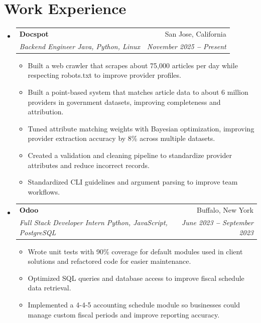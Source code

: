 \documentclass[11pt]{article}
\makeatletter
\newcommand{\resumeItem}[1]{
  \item\small{
    {#1 \vspace{-2pt}}
  }
}
\newcommand{\resumeSubheading}[4]{
  \vspace{-2pt}\item
    \begin{tabular*}{0.97\textwidth}[t]{l@{\extracolsep{\fill}}r}
      \textbf{#1} & #2 \\
      \textit{\small#3} & \textit{\small #4} \\
    \end{tabular*}\vspace{-7pt}
}
\newcommand{\resumeSubHeadingListStart}{\begin{itemize}[leftmargin=0.15in, label={}]}
\newcommand{\resumeSubHeadingListEnd}{\end{itemize}}
\newcommand{\resumeItemListStart}{\begin{itemize}[itemsep=3pt]}
\newcommand{\resumeItemListEnd}{\end{itemize}\vspace{-5pt}}
\makeatother
\begin{document}
\section{Work Experience}
  \vspace{3pt}
  \resumeSubHeadingListStart
    \resumeSubheading
      {Docspot}{San Jose, California}
      {Backend Engineer 	\textbar{} Java, Python, Linux}{November 2025 \textbf{--} Present}
        \resumeItemListStart
            \resumeItem{Built a web crawler that scrapes about 75,000 articles per day while respecting robots.txt to improve provider profiles.}
            \resumeItem{Built a point-based system that matches article data to about 6 million providers in government datasets, improving completeness and attribution.}
            \resumeItem{Tuned attribute matching weights with Bayesian optimization, improving provider extraction accuracy by 8\% across multiple datasets.}
            \resumeItem{Created a validation and cleaning pipeline to standardize provider attributes and reduce incorrect records.}
            \resumeItem{Standardized CLI guidelines and argument parsing to improve team workflows.}
        \resumeItemListEnd
    \resumeSubheading
      {Odoo}{Buffalo, New York}
      {Full Stack Developer Intern 	\textbar{} Python, JavaScript, PostgreSQL}{June 2023 \textbf{--} September 2023}
        \resumeItemListStart
            \resumeItem{Wrote unit tests with 90\% coverage for default modules used in client solutions and refactored code for easier maintenance.}
            \resumeItem{Optimized SQL queries and database access to improve fiscal schedule data retrieval.}
            \resumeItem{Implemented a 4-4-5 accounting schedule module so businesses could manage custom fiscal periods and improve reporting accuracy.}
        \resumeItemListEnd
    \resumeSubHeadingListEnd 
\end{document}
